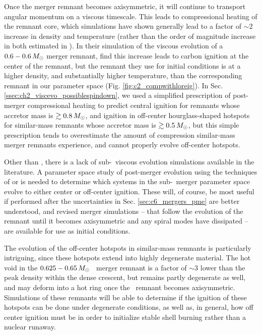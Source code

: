 Once the merger remnant becomes axisymmetric, it will continue to transport angular momentum on a viscous timescale.  This leads to compressional heating of the remnant core, which simulations \citep{schw+12, ji+13, rask+14} have shown generally lead to a factor of $\sim2$ increase in density and temperature (rather than the order of magnitude increase in both estimated in \citeal{vkercj10}).  In their simulation of the viscous evolution of a $0.6-0.6\,\Msun$ merger remnant, \cite{ji+13} find this increase leads to carbon ignition at the center of the remnant, but the remnant they use for initial conditions is at a higher density, and substantially higher temperature, than the corresponding remnant in our parameter space (Fig. \ref{fig:c2_compwithloreig}).  In Sec. \ref{ssec:ch2_viscevo_possiblespindown}, we used a simplified prescription of post-merger compressional heating to predict central ignition for remnants whose accretor mass is $\gtrsim0.8\,\Msun$, and ignition in off-center hourglass-shaped hotspots for similar-mass remnants whose accretor mass is $\gtrsim0.5\,\Msun$, but this simple prescription tends to overestimate the amount of compression similar-mass merger remnants experience, and cannot properly evolve off-center hotspots.

Other than \cite{ji+13}, there is a lack of sub-\Mch\ viscous evolution simulations available in the literature.  A parameter space study of post-merger evolution using the techniques of \cite{schw+12} or \cite{ji+13} is needed to determine which systems in the sub-\Mch\ merger parameter space evolve to either center or off-center ignition.  These will, of course, be most useful if performed after the uncertainties in Sec. \ref{sec:c6_mergers_pme} are better understood, and revised merger simulations -- that follow the evolution of the remnant until it becomes axisymmetric and any spiral modes have dissipated -- are available for use as initial conditions.

The evolution of the off-center hotspots in similar-mass remnants is particularly intriguing, since these hotspots extend into highly degenerate material.  The hot void in the $0.625-0.65\,\Msun$ \arepo\ merger remnant is a factor of $\sim3$ lower than the peak density within the dense crescent, but remains partly degenerate as well, and may deform into a hot ring once the \arepo\ remnant becomes axisymmetric.  Simulations of these remnants will be able to determine if the ignition of these hotspots can be done under degenerate conditions, as well as, in general, how off center ignition must be in order to initialize stable shell burning rather than a nuclear runaway.


